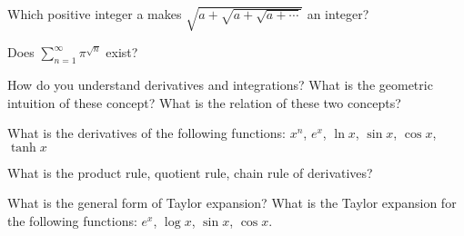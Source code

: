 \begin{exe}
Which positive integer a makes $\sqrt{a+\sqrt{a+\sqrt{a+\cdots}}}$ an integer?
\end{exe}
\begin{teacher}
\begin{sol}
\end{sol}
\end{teacher}

\begin{exe}
Does $\sum\limits_{n=1}^\infty \pi^{\sqrt{n}}$ exist?
\end{exe}
\begin{teacher}
\begin{sol}
\end{sol}
\end{teacher}



\begin{exe}
How do you understand derivatives and integrations? What is the geometric intuition of these concept? What is the relation of these two concepts?
\end{exe}
\begin{teacher}
\begin{sol}
\end{sol}
\end{teacher}

\begin{exe}
What is the derivatives of the following functions:
$x^n$, $e^x$, $\ln{x}$, $\sin{x}$, $\cos{x}$, $\tanh{x}$
\end{exe}
\begin{teacher}
\begin{sol}
\end{sol}
\end{teacher}

\begin{exe}
What is the product rule, quotient rule, chain rule of derivatives?
\end{exe}
\begin{teacher}
\begin{sol}
\end{sol}
\end{teacher}

\begin{exe}
What is the general form of Taylor expansion? What is the Taylor expansion for the following functions:
$e^x$, $\log{x}$, $\sin{x}$, $\cos{x}$.
\end{exe}
\begin{teacher}
\begin{sol}
\end{sol}
\end{teacher}

